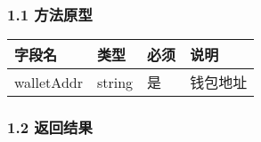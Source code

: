 \documentclass[letterpaper,10pt,english]{sphinxmanual}
\begin{document}
\subsubsection{1.1 方法原型}
\label{\detokenize{BCBWalletSDK_u63a5_u53e3_u8bf4_u660e:id70}}



\begin{savenotes}\sphinxattablestart
\centering
\begin{tabulary}{\linewidth}[t]{|T|T|T|T|}
\hline
\sphinxstyletheadfamily 
字段名
&\sphinxstyletheadfamily 
类型
&\sphinxstyletheadfamily 
必须
&\sphinxstyletheadfamily 
说明
\\
\hline
walletAddr
&
string
&
是
&
钱包地址
\\
\hline
\end{tabulary}
\par
\sphinxattableend\end{savenotes}


\subsubsection{1.2 返回结果}
\label{\detokenize{BCBWalletSDK_u63a5_u53e3_u8bf4_u660e:id71}}
\end{document}
